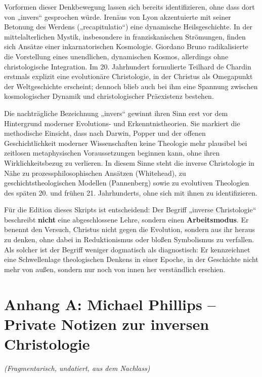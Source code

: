 \documentclass[
]{article}
\begin{document}
Vorformen dieser Denkbewegung lassen sich bereits identifizieren, ohne dass dort von „invers`` gesprochen würde. Irenäus von Lyon akzentuierte mit seiner Betonung des Werdens („recapitulatio``) eine dynamische Heilsgeschichte. In der mittelalterlichen Mystik, insbesondere in franziskanischen Strömungen, finden sich Ansätze einer inkarnatorischen Kosmologie. Giordano Bruno radikalisierte die Vorstellung eines unendlichen, dynamischen Kosmos, allerdings ohne christologische Integration. Im 20. Jahrhundert formulierte Teilhard de Chardin erstmals explizit eine evolutionäre Christologie, in der Christus als Omegapunkt der Weltgeschichte erscheint; dennoch blieb auch bei ihm eine Spannung zwischen kosmologischer Dynamik und christologischer Präexistenz bestehen.

Die nachträgliche Bezeichnung „invers`` gewinnt ihren Sinn erst vor dem Hintergrund moderner Evolutions- und Erkenntnistheorien. Sie markiert die methodische Einsicht, dass nach Darwin, Popper und der offenen Geschichtlichkeit moderner Wissenschaften keine Theologie mehr plausibel bei zeitlosen metaphysischen Voraussetzungen beginnen kann, ohne ihren Wirklichkeitsbezug zu verlieren. In diesem Sinne steht die inverse Christologie in Nähe zu prozessphilosophischen Ansätzen (Whitehead), zu geschichtstheologischen Modellen (Pannenberg) sowie zu evolutiven Theologien des späten 20. und frühen 21. Jahrhunderts, ohne sich mit ihnen zu identifizieren.

Für die Edition dieses Skripts ist entscheidend: Der Begriff „inverse Christologie`` beschreibt \textbf{nicht} eine abgeschlossene Lehre, sondern einen \textbf{Arbeitsmodus}. Er benennt den Versuch, Christus nicht gegen die Evolution, sondern aus ihr heraus zu denken, ohne dabei in Reduktionismus oder bloßen Symbolismus zu verfallen. Als solcher ist der Begriff weniger dogmatisch als diagnostisch: Er kennzeichnet eine Schwellenlage theologischen Denkens in einer Epoche, in der Geschichte nicht mehr von außen, sondern nur noch von innen her verständlich erschien.

\section{\texorpdfstring{Anhang A: \textbf{Michael Phillips -- Private Notizen zur inversen Christologie}}{Anhang A: Michael Phillips -- Private Notizen zur inversen Christologie}}\label{anhang-a-michael-phillips-private-notizen-zur-inversen-christologie}

\emph{(Fragmentarisch, undatiert, aus dem Nachlass)}
\end{document}
